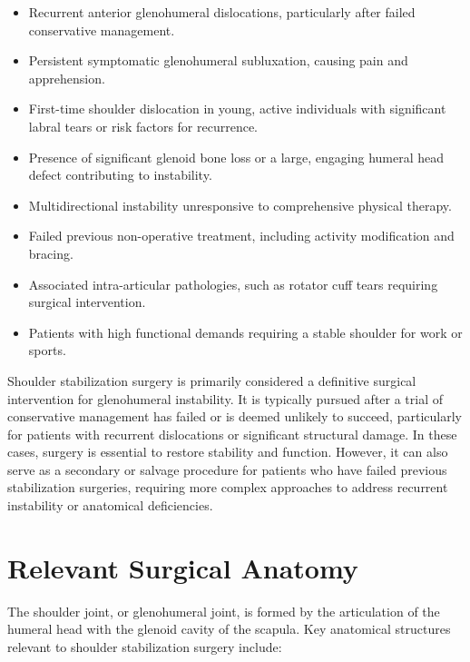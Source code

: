\begin{itemize}
  \item Recurrent anterior glenohumeral dislocations, particularly after failed conservative management.
  \item Persistent symptomatic glenohumeral subluxation, causing pain and apprehension.
  \item First-time shoulder dislocation in young, active individuals with significant labral tears or risk factors for recurrence.
  \item Presence of significant glenoid bone loss or a large, engaging humeral head defect contributing to instability.
  \item Multidirectional instability unresponsive to comprehensive physical therapy.
  \item Failed previous non-operative treatment, including activity modification and bracing.
  \item Associated intra-articular pathologies, such as rotator cuff tears requiring surgical intervention.
  \item Patients with high functional demands requiring a stable shoulder for work or sports.
\end{itemize}

Shoulder stabilization surgery is primarily considered a definitive surgical intervention for glenohumeral instability. It is typically pursued after a trial of conservative management has failed or is deemed unlikely to succeed, particularly for patients with recurrent dislocations or significant structural damage. In these cases, surgery is essential to restore stability and function. However, it can also serve as a secondary or salvage procedure for patients who have failed previous stabilization surgeries, requiring more complex approaches to address recurrent instability or anatomical deficiencies.

\section*{Relevant Surgical Anatomy}
The shoulder joint, or glenohumeral joint, is formed by the articulation of the humeral head with the glenoid cavity of the scapula. Key anatomical structures relevant to shoulder stabilization surgery include:

